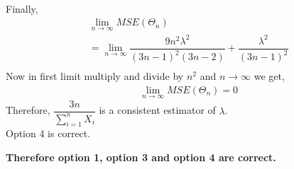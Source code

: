 \documentclass[journal,12pt,twocolumn]{IEEEtran}
\theoremstyle{definition}
\begin{document}
\begin{enumerate}
\begin{align}
\end{align}
Finally,
\begin{align}
    & \lim_{n\to\infty} MSE( \Theta_n) \\
     &= \lim_{n\to\infty} \dfrac{9n^2\lambda^2}{(3n-1)^2(3n-2)} + \dfrac{\lambda^2}{(3n-1)^2} \\
\end{align}
Now in first limit multiply and divide by $ n^2$ and $ {n\to\infty} $ we get,
\begin{align}
     & \lim_{n\to\infty} MSE( \Theta_n) =0
\end{align}
Therefore, $\dfrac{3n}{\sum_{i=1}^{n} X_i} $ is a consistent estimator of $ \lambda$. \\
Option 4 is correct. \\
\end{enumerate}
\textbf{Therefore option 1, option 3 and option 4 are correct.}
\end{document}
